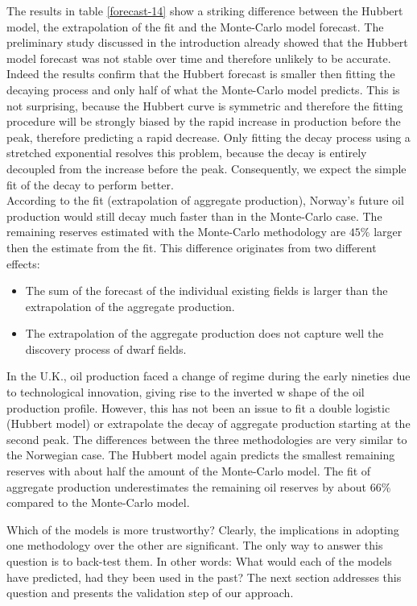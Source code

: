 \documentclass[review]{elsarticle}
\begin{document}
The results in table \ref{forecast-14} show a striking difference
between the Hubbert model, the extrapolation of the fit and the Monte-Carlo model forecast. The preliminary study discussed in the introduction already showed that the Hubbert model forecast was not stable over time and therefore unlikely to be accurate. Indeed the results confirm that the Hubbert forecast is smaller then fitting the decaying process and only half of what the Monte-Carlo model predicts. This is not surprising, because the Hubbert curve is symmetric and therefore the fitting procedure will be strongly biased by the rapid increase in production before the peak, therefore predicting a rapid decrease. Only fitting the decay process using a stretched exponential resolves this problem, because the decay is entirely decoupled from the increase before the peak. Consequently, we expect the simple fit of the decay to perform better.\\
According to the fit (extrapolation of aggregate production), Norway's future oil production would still decay much faster than in the Monte-Carlo case. The remaining reserves estimated with the Monte-Carlo methodology are $45\%$ larger
then the estimate from the fit. This difference originates from two
different effects:
\begin{itemize}
\item The sum of the forecast of the individual existing fields is larger
than the extrapolation of the aggregate production.
\item The extrapolation of the aggregate production does not capture well
the discovery process of dwarf fields.
\end{itemize}
In the U.K., oil production faced a change of regime during the early
nineties due to technological innovation, giving rise to the inverted
\textquotedbl{}w shape\textquotedbl{} of the oil production profile.
However, this has not been an issue to fit a double logistic (Hubbert model) or extrapolate the decay of aggregate production starting at the second peak. The differences between the three methodologies are very similar to the Norwegian case. The Hubbert model again predicts the smallest remaining reserves with about half the amount of the Monte-Carlo model. The fit of aggregate production underestimates the remaining oil reserves by about $66\%$ compared to the Monte-Carlo model.

Which of the models is more trustworthy? Clearly, the implications
in adopting one methodology over the other are significant. The only
way to answer this question is to back-test them. In other words:
\textquotedbl{}What would each of the models have predicted, had they
been used in the past?\textquotedbl{} The next section addresses
this question and presents the validation step of our approach.
\end{document}
